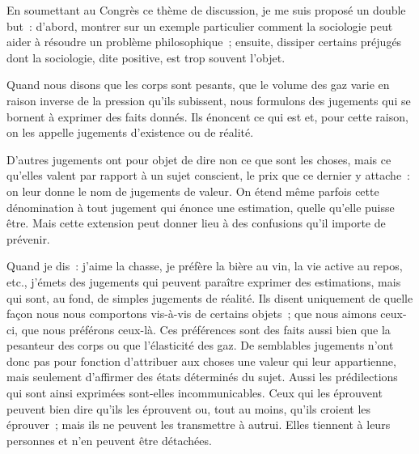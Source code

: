 \documentclass[french,twoside]{book} %
\begin{document}
\noindent En soumettant au Congrès ce thème de discussion, je me suis proposé un double but : d’abord, montrer sur un exemple particulier comment la sociologie peut aider à résoudre un problème philosophique ; ensuite, dissiper certains préjugés dont la sociologie, dite positive, est trop souvent l’objet.\par
Quand nous disons que les corps sont pesants, que le volume des gaz varie en raison inverse de la pression qu’ils subissent, nous formulons des jugements qui se bornent à exprimer des faits donnés. Ils énoncent ce qui est et, pour cette raison, on les appelle jugements d’existence ou de réalité.\par
D’autres jugements ont pour objet de dire non ce que sont les choses, mais ce qu’elles valent par rapport à un sujet conscient, le prix que ce dernier y attache : on leur donne le nom de jugements de valeur. On étend même parfois cette dénomination à tout jugement qui énonce une estimation, quelle qu’elle puisse être. Mais cette extension peut donner lieu à des confusions qu’il importe de prévenir.\par
Quand je dis : j’aime la chasse, je préfère la bière au vin, la vie active au repos, etc., j’émets des jugements qui peuvent paraître exprimer des estimations, mais qui sont, au fond, de simples jugements de réalité. Ils disent uniquement de quelle façon nous nous comportons vis-à-vis de certains objets ; que nous aimons ceux-ci, que nous préférons ceux-là. Ces préférences sont des faits aussi bien que la pesanteur des corps ou que l’élasticité des gaz. De semblables jugements n’ont donc pas pour fonction d’attribuer aux choses une valeur qui leur appartienne, mais seulement d’affirmer des états déterminés du sujet. Aussi les prédilections qui sont ainsi exprimées sont-elles incommunicables. Ceux qui les éprouvent peuvent bien dire qu’ils les éprouvent ou, tout au moins, qu’ils croient les éprouver ; mais ils ne peuvent les transmettre à autrui. Elles tiennent à leurs personnes et n’en peuvent être détachées.\par
\end{document}
